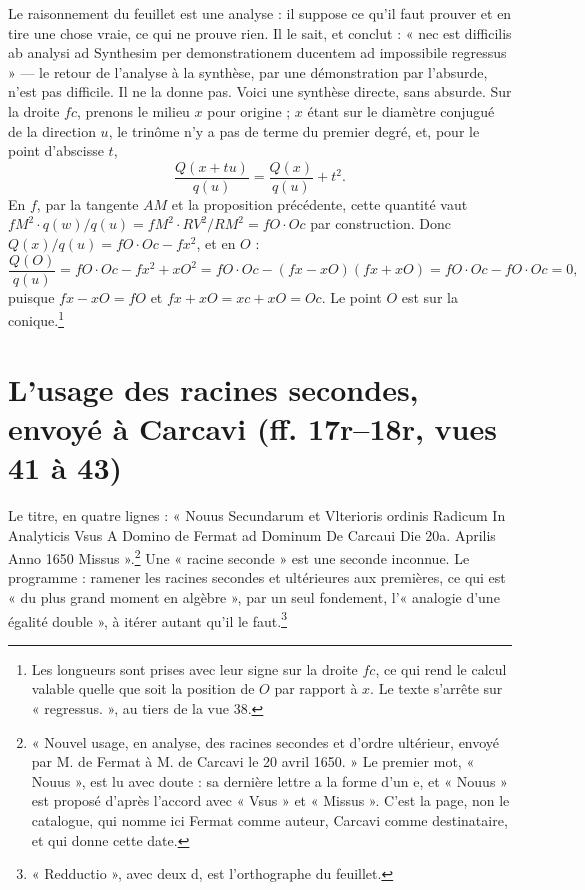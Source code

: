 \documentclass[11pt,a4paper]{article}
\begin{document}
Le raisonnement du feuillet est une analyse : il suppose ce qu'il faut prouver
et en tire une chose vraie, ce qui ne prouve rien. Il le sait, et conclut :
« nec est difficilis ab analysi ad Synthesim per demonstrationem ducentem ad
impossibile regressus » — le retour de l'analyse à la synthèse, par une
démonstration par l'absurde, n'est pas difficile. Il ne la donne pas. Voici une
synthèse directe, sans absurde. Sur la droite $fc$, prenons le milieu $x$
pour origine ; $x$ étant sur le diamètre conjugué de la direction $u$, le
trinôme n'y a pas de terme du premier degré, et, pour le point d'abscisse $t$,
\[ \frac{Q(x + tu)}{q(u)} = \frac{Q(x)}{q(u)} + t^2 . \]
En $f$, par la tangente $AM$ et la proposition précédente, cette quantité vaut
$fM^2\cdot q(w)/q(u) = fM^2\cdot RV^2/RM^2 = fO\cdot Oc$ par construction. Donc
$Q(x)/q(u) = fO\cdot Oc - fx^2$, et en $O$ :
\[ \frac{Q(O)}{q(u)} = fO\cdot Oc - fx^2 + xO^2
   = fO\cdot Oc - (fx - xO)(fx + xO) = fO\cdot Oc - fO\cdot Oc = 0 , \]
puisque $fx - xO = fO$ et $fx + xO = xc + xO = Oc$. Le point $O$ est sur la
conique.\footnote{Les longueurs sont prises avec leur signe sur la droite
$fc$, ce qui rend le calcul valable quelle que soit la position de $O$ par
rapport à $x$. Le texte s'arrête sur « regressus. », au tiers de la vue 38.}

\section*{L'usage des racines secondes, envoyé à Carcavi (ff. 17r–18r, vues 41 à 43)}

Le titre, en quatre lignes : « Nouus Secundarum et Vlterioris ordinis Radicum
In Analyticis Vsus A Domino de Fermat ad Dominum De Carcaui Die 20a. Aprilis
Anno 1650 Missus ».\footnote{« Nouvel usage, en analyse, des racines secondes
et d'ordre ultérieur, envoyé par M. de Fermat à M. de Carcavi le 20 avril
1650. » Le premier mot, « Nouus », est lu avec doute : sa dernière lettre a la
forme d'un e, et « Nouus » est proposé d'après l'accord avec « Vsus » et
« Missus ». C'est la page, non le catalogue, qui nomme ici Fermat comme auteur,
Carcavi comme destinataire, et qui donne cette date.} Une « racine seconde »
est une seconde inconnue. Le programme : ramener les racines secondes et
ultérieures aux premières, ce qui est « du plus grand moment en algèbre », par
un seul fondement, l'« analogie d'une égalité double », à itérer autant qu'il
le faut.\footnote{« Redductio », avec deux d, est l'orthographe du feuillet.}
\end{document}
